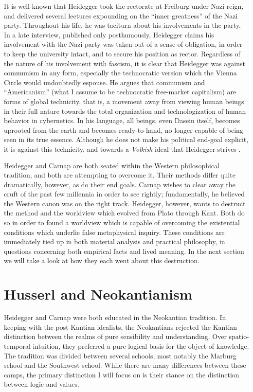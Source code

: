 \documentclass[leqno, 12pt]{turabian-researchpaper}
\begin{document}
	It is well-known that Heidegger took the rectorate at Freiburg under Nazi
	reign, and delivered several lectures expounding on the \enquote{inner greatness}
	of the Nazi party. Throughout his life, he was taciturn about his involvements
	in the party. In a late interview, published only posthumously, Heidegger claims
	his involvement with the Nazi party was taken out of a sense of obligation, in
	order to keep the university intact, and to secure his position as rector.
	Regardless of the nature of his involvement with fascism, it is clear that Heidegger
	was against communism in any form, especially the technocratic version which
	the Vienna Circle would undoubtedly espouse. He argues that communism and \enquote{Americanism}
	(what I assume to be technocratic free-market capitalism) are forms of global
	technicity, that is, a movement away from viewing human beings in their full
	nature towards the total organization and technologization of human behavior
	in cybernetics. In his language, all beings, even Dasein itself, becomes
	uprooted from the earth and becomes ready-to-hand, no longer capable of being seen
	in its true essence. Although he does not make his political end-goal explicit,
	it is against this technicity, and towards a \textit{Volkish} ideal that Heidegger
	strives \autocite{heidegger1981}.

	Heidegger and Carnap are both seated within the Western philosophical
	tradition, and both are attempting to overcome it. Their methods differ quite
	dramatically, however, as do their end goals. Carnap wishes to clear away the cruft
	of the past few millennia in order to see rightly; fundamentally, he believed the
	Western canon was on the right track. Heidegger, however, wants to destruct
	the method and the worldview which evolved from Plato through Kant. Both do so
	in order to found a worldview which is capable of overcoming the existential conditions
	which underlie false metaphysical inquiry. These conditions are immediately
	tied up in both material analysis and practical philosophy, in questions concerning
	both empirical facts and lived meaning. In the next section we will take a
	look at how they each went about this destruction.

	\section{Husserl and Neokantianism}

	Heidegger and Carnap were both educated in the Neokantian tradition. In
	keeping with the post-Kantian idealists, the Neokantians rejected the Kantian distinction
	between the realms of pure sensibility and understanding. Over spatio-temporal
	intuition, they preferred a pure logical basis for the object of knowledge.
	\autocite[28]{friedman2000} The tradition was divided between several schools,
	most notably the Marburg school and the Southwest school. While there are many
	differences between these camps, the primary distinction I will focus on is their
	stance on the distinction between logic and values.
\end{document}
